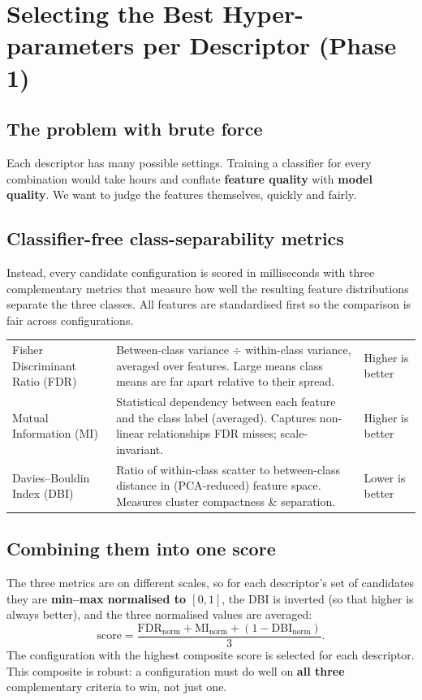 \section{Selecting the Best Hyper-parameters per Descriptor (Phase 1)}
\label{sec:hyper}

\subsection{The problem with brute force}
Each descriptor has many possible settings. Training a classifier for every combination would take
hours and conflate \textbf{feature quality} with \textbf{model quality}. We want to judge the
features themselves, quickly and fairly.

\subsection{Classifier-free class-separability metrics}
Instead, every candidate configuration is scored in milliseconds with three complementary metrics
that measure how well the resulting feature distributions separate the three classes. All features
are standardised first so the comparison is fair across configurations.

\begin{center}
\begin{tabularx}{\textwidth}{@{}l Y l@{}}
\toprule
{} &  &  \\
\midrule
Fisher Discriminant Ratio (FDR) & Between-class variance $\div$ within-class variance, averaged over
features. Large means class means are far apart relative to their spread. & Higher is better \\
Mutual Information (MI) & Statistical dependency between each feature and the class label (averaged).
Captures non-linear relationships FDR misses; scale-invariant. & Higher is better \\
Davies--Bouldin Index (DBI) & Ratio of within-class scatter to between-class distance in
(PCA-reduced) feature space. Measures cluster compactness \& separation. & Lower is better \\
\bottomrule
\end{tabularx}
\end{center}

\subsection{Combining them into one score}
The three metrics are on different scales, so for each descriptor's set of candidates they are
\textbf{min--max normalised to $[0,1]$}, the DBI is inverted (so that higher is always better), and
the three normalised values are averaged:
\begin{equation*}
\text{score} = \frac{\text{FDR}_{\text{norm}} + \text{MI}_{\text{norm}} + (1 - \text{DBI}_{\text{norm}})}{3}.
\end{equation*}
The configuration with the highest composite score is selected for each descriptor. This composite is
robust: a configuration must do well on \textbf{all three} complementary criteria to win, not just
one.

